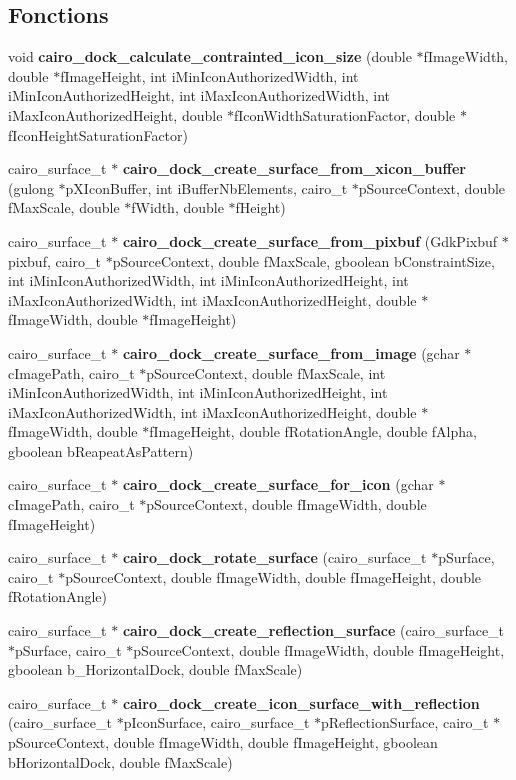 \subsection*{Fonctions}
\begin{CompactItemize}
\item 
void {\bf cairo\_\-dock\_\-calculate\_\-contrainted\_\-icon\_\-size} (double $\ast$fImageWidth, double $\ast$fImageHeight, int iMinIconAuthorizedWidth, int iMinIconAuthorizedHeight, int iMaxIconAuthorizedWidth, int iMaxIconAuthorizedHeight, double $\ast$fIconWidthSaturationFactor, double $\ast$fIconHeightSaturationFactor)
\item 
cairo\_\-surface\_\-t $\ast$ {\bf cairo\_\-dock\_\-create\_\-surface\_\-from\_\-xicon\_\-buffer} (gulong $\ast$pXIconBuffer, int iBufferNbElements, cairo\_\-t $\ast$pSourceContext, double fMaxScale, double $\ast$fWidth, double $\ast$fHeight)
\item 
cairo\_\-surface\_\-t $\ast$ {\bf cairo\_\-dock\_\-create\_\-surface\_\-from\_\-pixbuf} (GdkPixbuf $\ast$pixbuf, cairo\_\-t $\ast$pSourceContext, double fMaxScale, gboolean bConstraintSize, int iMinIconAuthorizedWidth, int iMinIconAuthorizedHeight, int iMaxIconAuthorizedWidth, int iMaxIconAuthorizedHeight, double $\ast$fImageWidth, double $\ast$fImageHeight)
\item 
cairo\_\-surface\_\-t $\ast$ {\bf cairo\_\-dock\_\-create\_\-surface\_\-from\_\-image} (gchar $\ast$cImagePath, cairo\_\-t $\ast$pSourceContext, double fMaxScale, int iMinIconAuthorizedWidth, int iMinIconAuthorizedHeight, int iMaxIconAuthorizedWidth, int iMaxIconAuthorizedHeight, double $\ast$fImageWidth, double $\ast$fImageHeight, double fRotationAngle, double fAlpha, gboolean bReapeatAsPattern)
\item 
cairo\_\-surface\_\-t $\ast$ {\bf cairo\_\-dock\_\-create\_\-surface\_\-for\_\-icon} (gchar $\ast$cImagePath, cairo\_\-t $\ast$pSourceContext, double fImageWidth, double fImageHeight)
\item 
cairo\_\-surface\_\-t $\ast$ {\bf cairo\_\-dock\_\-rotate\_\-surface} (cairo\_\-surface\_\-t $\ast$pSurface, cairo\_\-t $\ast$pSourceContext, double fImageWidth, double fImageHeight, double fRotationAngle)
\item 
cairo\_\-surface\_\-t $\ast$ {\bf cairo\_\-dock\_\-create\_\-reflection\_\-surface} (cairo\_\-surface\_\-t $\ast$pSurface, cairo\_\-t $\ast$pSourceContext, double fImageWidth, double fImageHeight, gboolean b\_\-HorizontalDock, double fMaxScale)
\item 
cairo\_\-surface\_\-t $\ast$ {\bf cairo\_\-dock\_\-create\_\-icon\_\-surface\_\-with\_\-reflection} (cairo\_\-surface\_\-t $\ast$pIconSurface, cairo\_\-surface\_\-t $\ast$pReflectionSurface, cairo\_\-t $\ast$pSourceContext, double fImageWidth, double fImageHeight, gboolean bHorizontalDock, double fMaxScale)

\end{CompactItemize}
